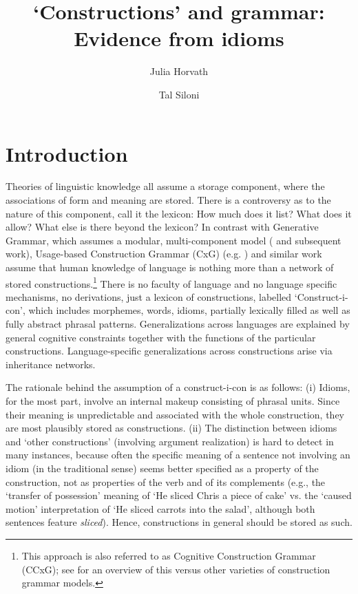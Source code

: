 \documentclass[output=paper,
modfonts
]{LSP/langsci}
\title{`Constructions' and grammar: Evidence from idioms}
\author{%
Julia Horvath\affiliation{Tel Aviv University}\and 
Tal Siloni\affiliation{Tel Aviv University}
}
\begin{document}
\maketitle

\section{Introduction}
Theories of linguistic knowledge all assume a storage component, where
the associations of form and meaning are stored. There is a controversy as to the nature of this component, call it the lexicon: How much does it list? What does it allow? What else is there beyond the lexicon? In
contrast with Generative Grammar, which assumes a modular,
multi-component model (\citealt{chomsky1965} and subsequent work), Usage-based
Construction Grammar (CxG) (e.g. \citealt{goldberg2006}) and similar work assume
that human knowledge of language is nothing more than a network of
stored constructions.\footnote{This approach is also referred to as Cognitive Construction Grammar
(CCxG); see \citet{boas2013} for an overview of this versus other varieties
of construction grammar models.} There is no faculty of language and no language specific mechanisms, no derivations, just a lexicon of constructions, labelled `Construct-i-con', 
which includes morphemes, words, idioms, partially lexically filled as well 
as fully abstract phrasal patterns. Generalizations across languages are explained 
by general cognitive constraints together with the functions of the
particular constructions. Language-specific generalizations across
constructions arise via inheritance networks.

The rationale behind the assumption of a construct-i-con is as follows:
(i) Idioms, for the most part, involve an internal makeup consisting of
phrasal units. Since their meaning is unpredictable and associated with
the whole construction, they are most plausibly stored as constructions.
(ii) The distinction between idioms and `other constructions' (involving
argument realization) is hard to detect in many instances, because often
the specific meaning of a sentence not involving an idiom (in the
traditional sense) seems better specified as a property of the
construction, not as properties of the verb and of its complements
(e.g., the `transfer of possession' meaning of `He sliced Chris a piece
of cake' vs. the `caused motion' interpretation of `He sliced carrots
into the salad', although both sentences feature \emph{sliced}). Hence,
constructions in general should be stored as such.
\end{document}
